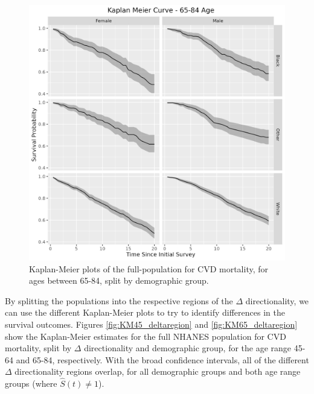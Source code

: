 \documentclass[
]{article}
\begin{document}
\begin{figure}
\hypertarget{fig:KM65tot}{%
\centering
\includegraphics{./Rmarkdown_Plots/SurvProbKM_65-84.png}
\caption{Kaplan-Meier plots of the full-population for CVD mortality, for ages between 65-84, split by demographic group.}\label{fig:KM65tot}
}
\end{figure}

By splitting the populations into the respective regions of the \(\Delta\) directionality, we can use the different Kaplan-Meier plots to try to identify differences in the survival outcomes. Figures \ref{fig:KM45_deltaregion} and \ref{fig:KM65_deltaregion} show the Kaplan-Meier estimates for the full NHANES population for CVD mortality, split by \(\Delta\) directionality and demographic group, for the age range 45-64 and 65-84, respectively. With the broad confidence intervals, all of the different \(\Delta\) directionality regions overlap, for all demographic groups and both age range groups (where \(\hat{S}(t)\neq 1\)).
\end{document}
